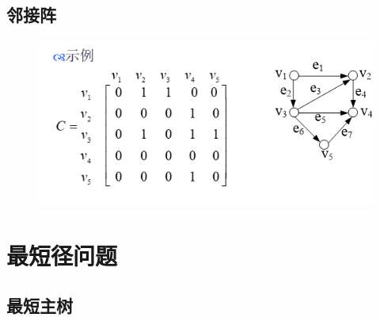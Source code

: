\subsection{邻接阵}
\begin{figure}[H]
	\centering
	\includegraphics[width=0.7\linewidth]{figures/screenshot067}
	\caption{}
	\label{fig:screenshot067}
\end{figure}
\section{最短径问题}
\subsection{最短主树}
